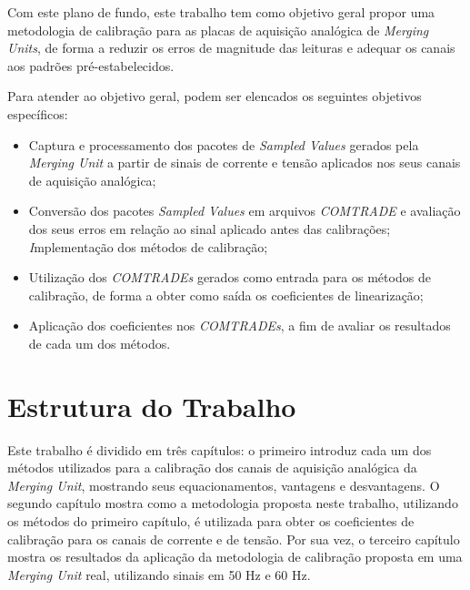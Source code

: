 Com este plano de fundo, este trabalho tem como objetivo geral propor uma metodologia de calibração para as placas de aquisição analógica de \textit{Merging Units}, de forma a reduzir os erros de magnitude das leituras e adequar os canais aos padrões pré-estabelecidos.

Para atender ao objetivo geral, podem ser elencados os seguintes objetivos específicos:

\begin{itemize}
    \item Captura e processamento dos pacotes de \textit{Sampled Values} \cite{IEC61850-9-2} gerados pela \textit{Merging Unit} a partir de sinais de corrente e tensão aplicados nos seus canais de aquisição analógica;
    \item Conversão dos pacotes \textit{Sampled Values} em arquivos \textit{COMTRADE} \cite{comtrade1992} e avaliação dos seus erros em relação ao sinal aplicado antes das calibrações;
    \textit Implementação dos métodos de calibração;
    \item Utilização dos \textit{COMTRADEs} gerados como entrada para os métodos de calibração, de forma a obter como saída os coeficientes de linearização;
    \item Aplicação dos coeficientes nos \textit{COMTRADEs}, a fim de avaliar os resultados de cada um dos métodos.
\end{itemize}


\section{Estrutura do Trabalho}

Este trabalho é dividido em três capítulos: o primeiro introduz cada um dos métodos utilizados para a calibração dos canais de aquisição analógica da \textit{Merging Unit}, mostrando seus equacionamentos, vantagens e desvantagens. O segundo capítulo mostra como a metodologia proposta neste trabalho, utilizando os métodos do primeiro capítulo, é utilizada para obter os coeficientes de calibração para os canais de corrente e de tensão. Por sua vez, o terceiro capítulo mostra os resultados da aplicação da metodologia de calibração proposta em uma \textit{Merging Unit} real, utilizando sinais em 50 Hz e 60 Hz.









